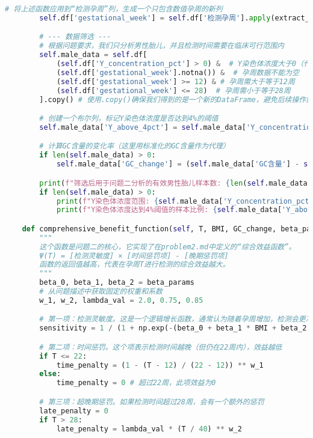 \documentclass[UTF8, a4paper, 11pt]{ctexart}
\begin{document}
\begin{lstlisting}[language=Python, caption={问题二的解决方案脚本。}]
        # 将上述函数应用到“检测孕周”列，生成一个只包含数值孕周的新列
        self.df['gestational_week'] = self.df['检测孕周'].apply(extract_week)

        # --- 数据筛选 ---
        # 根据问题要求，我们只分析男性胎儿，并且检测时间需要在临床可行范围内
        self.male_data = self.df[
            (self.df['Y_concentration_pct'] > 0) &  # Y染色体浓度大于0（代表男性胎儿）
            (self.df['gestational_week'].notna()) &  # 孕周数据不能为空
            (self.df['gestational_week'] >= 12) & # 孕周需大于等于12周
            (self.df['gestational_week'] <= 28)  # 孕周需小于等于28周
        ].copy() # 使用.copy()确保我们得到的是一个新的DataFrame，避免后续操作影响原始数据

        # 创建一个布尔列，标记Y染色体浓度是否达到4%的阈值
        self.male_data['Y_above_4pct'] = self.male_data['Y_concentration_pct'] >= 4.0

        # 计算GC含量的变化率（这里用标准化的GC含量作为代理）
        if len(self.male_data) > 0:
            self.male_data['GC_change'] = (self.male_data['GC含量'] - self.male_data['GC含量'].mean()) / self.male_data['GC含量'].std()

        print(f"筛选后用于问题二分析的有效男性胎儿样本数: {len(self.male_data)}")
        if len(self.male_data) > 0:
            print(f"Y染色体浓度范围: {self.male_data['Y_concentration_pct'].min():.6f} - {self.male_data['Y_concentration_pct'].max():.6f}")
            print(f"Y染色体浓度达到4%阈值的样本比例: {self.male_data['Y_above_4pct'].mean()*100:.2f}%")

    def comprehensive_benefit_function(self, T, BMI, GC_change, beta_params):
        """
        这个函数是问题二的核心，它实现了在problem2.md中定义的“综合效益函数”。
        Ψ(T) = [检测灵敏度] × [时间惩罚项] - [晚期惩罚项]
        函数的返回值越高，代表在孕周T进行检测的综合效益越大。
        """
        beta_0, beta_1, beta_2 = beta_params
        # 从问题描述中获取固定的权重和系数
        w_1, w_2, lambda_val = 2.0, 0.75, 0.85

        # 第一项：检测灵敏度。这是一个逻辑增长函数，通常认为随着孕周增加，检测会更准
        sensitivity = 1 / (1 + np.exp(-(beta_0 + beta_1 * BMI + beta_2 * GC_change)))

        # 第二项：时间惩罚。这个项表示检测时间越晚（但仍在22周内），效益越低
        if T <= 22:
            time_penalty = (1 - (T - 12) / (22 - 12)) ** w_1
        else:
            time_penalty = 0 # 超过22周，此项效益为0

        # 第三项：超晚期惩罚。如果检测时间超过28周，会有一个额外的惩罚
        late_penalty = 0
        if T > 28:
            late_penalty = lambda_val * (T / 40) ** w_2


\end{lstlisting}
\end{document}
